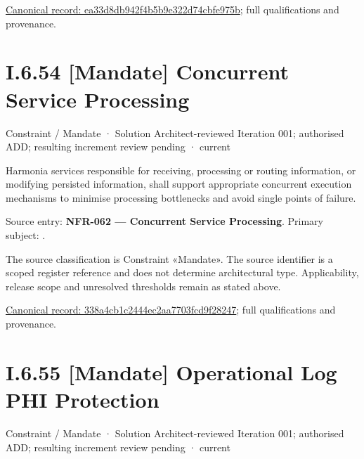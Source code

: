 {\footnotesize \href{../../../../continuum/motivation/constraint/mandate/ea33d8db942f4b5b9e322d74cbfe975b.md}{Canonical record: ea33d8db942f4b5b9e322d74cbfe975b}; full qualifications and provenance.}\par
\section*{I.6.54 [Mandate] Concurrent Service Processing}
\label{navigation:I.6.54}

\label{element:338a4cb1c2444ec2aa7703fcd9f28247}
{\small Constraint / Mandate · Solution Architect-reviewed Iteration 001; authorised ADD; resulting increment review pending · current}\par

Harmonia services responsible for receiving, processing or routing information, or modifying persisted information, shall support appropriate concurrent execution mechanisms to minimise processing bottlenecks and avoid single points of failure.



Source entry: \textbf{NFR-062 — Concurrent Service Processing}. Primary subject: \texttt{}.



The source classification is Constraint «Mandate». The source identifier is a scoped register reference and does not determine architectural type. Applicability, release scope and unresolved thresholds remain as stated above.


{\footnotesize \href{../../../../continuum/motivation/constraint/mandate/338a4cb1c2444ec2aa7703fcd9f28247.md}{Canonical record: 338a4cb1c2444ec2aa7703fcd9f28247}; full qualifications and provenance.}\par
\section*{I.6.55 [Mandate] Operational Log PHI Protection}
\label{navigation:I.6.55}

\label{element:ab99a48c29c14a1883e820baf98b643a}
{\small Constraint / Mandate · Solution Architect-reviewed Iteration 001; authorised ADD; resulting increment review pending · current}\par

